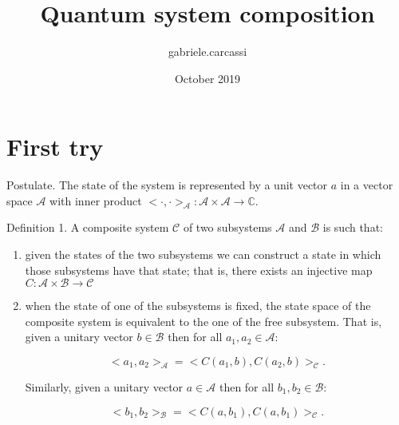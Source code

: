 \documentclass{article}
\title{Quantum system composition}
\author{gabriele.carcassi }
\date{October 2019}
\begin{document}
\maketitle

\section{First try}

Postulate. The state of the system is represented by a unit vector $a$ in a vector space $\mathcal{A}$ with inner product $< \cdot, \cdot >_\mathcal{A} : \mathcal{A} \times \mathcal{A} \to \mathbb{C}$.


Definition 1. A composite system $\mathcal{C}$ of two subsystems $\mathcal{A}$ and $\mathcal{B}$ is such that:
\begin{enumerate}
    \item given the states of the two subsystems we can construct a state in which those subsystems have that state; that is, there exists an injective map $C : \mathcal{A} \times \mathcal{B} \to \mathcal{C}$
    
    \item when the state of one of the subsystems is fixed, the state space of the composite system is equivalent to the one of the free subsystem. That is, given a unitary vector $b \in \mathcal{B}$ then for all $a_1, a_2 \in \mathcal{A}$:
    
    $$<a_1, a_2>_\mathcal{A} = <C(a_1, b), C(a_2, b)>_\mathcal{C}.$$
    
    Similarly, given a unitary vector $a \in \mathcal{A}$ then for all $b_1, b_2 \in \mathcal{B}$:
    
    $$<b_1, b_2>_\mathcal{B} = <C(a, b_1), C(a, b_1)>_\mathcal{C}.$$
    
\end{enumerate}
\end{document}
